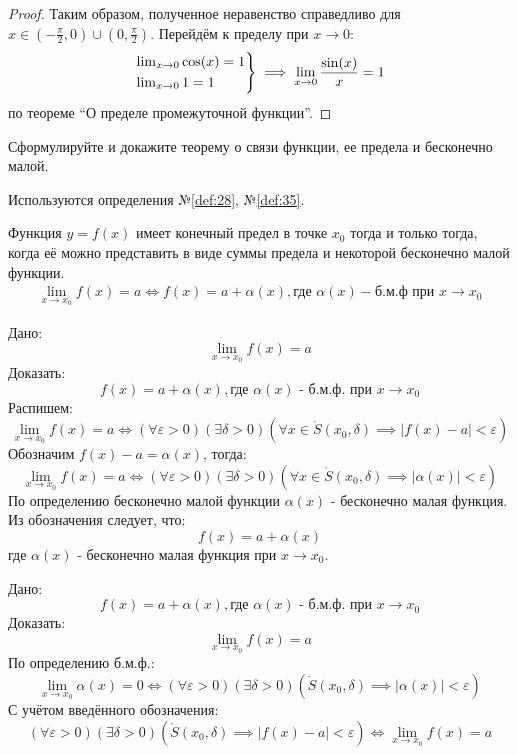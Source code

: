 \begin{proof}
    Таким образом, полученное неравенство справедливо для $x \in \left(-\frac{\pi}{2}, 0\right) \cup \left(0, \frac{\pi}{2}\right)$. Перейдём к пределу при $x \to 0$:
    \begin{gather*}
        \begin{rcases*}
            \lim_{x \to 0} \cos(x) = 1 \\
            \lim_{x \to 0} 1 = 1 
        \end{rcases*} 
        \implies \lim_{x \to 0} \frac{\sin(x)}{x} = 1
    \end{gather*}
    по теореме ``О пределе промежуточной функции''.
\end{proof}
\pagebreak



\begin{question}
    Сформулируйте и докажите теорему о связи функции, ее предела и бесконечно малой.
\end{question}
\begin{used}
    Используются определения №\ref{def:28}, №\ref{def:35}.
\end{used}
\begin{theorem}
    Функция $y = f(x)$ имеет конечный предел в точке  $x_0$ тогда и только тогда, когда её можно представить в виде суммы предела и некоторой бесконечно малой функции.
    \begin{gather*}
        \lim_{x \to x_0} f(x) = a \iff f(x) = a + \alpha(x), \text{где } \alpha(x) - \text{б.м.ф при } x \to x_0
    \end{gather*}
\end{theorem}
\begin{necessity}
    Дано: \[
        \lim_{x \to x_0} f(x) = a
    \]
    Доказать: \[
        f(x) = a + \alpha(x), \text{где } \alpha(x) \text{ - б.м.ф. при } x \to  x_0
    \]
    Распишем: \[
        \lim_{x \to x_0} f(x) = a \iff (\forall \varepsilon > 0)(\exists \delta > 0)(\forall x \in \mathring{S}(x_0, \delta) \implies |f(x) - a| < \varepsilon)  
    \]
    Обозначим $f(x) - a = \alpha(x)$, тогда: \[
        \lim_{x \to x_0} f(x) = a \iff (\forall \varepsilon > 0)(\exists \delta > 0)(\forall x \in \mathring{S}(x_0, \delta) \implies |\alpha(x)| < \varepsilon)  
    \]
    По определению бесконечно малой функции $\alpha(x)$ - бесконечно малая функция. Из обозначения следует, что: \[
        f(x) = a + \alpha(x)
    \]
    где $\alpha(x)$ - бесконечно малая функция при $x \to x_0$.
\end{necessity}
\begin{sufficiency}
    Дано: \[
        f(x) = a + \alpha(x), \text{где } \alpha(x) \text{ - б.м.ф. при } x \to x_0
    \]
    Доказать: \[
        \lim_{x \to x_0} f(x) = a
    \]
    По определению б.м.ф.: \[
        \lim_{x \to x_0} \alpha(x) = 0 \iff (\forall \varepsilon > 0)(\exists \delta > 0)(\mathring{S}(x_0, \delta) \implies |\alpha(x)| < \varepsilon)
    \]
    С учётом введённого обозначения: \[
        (\forall \varepsilon > 0)(\exists \delta > 0)(\mathring{S}(x_0, \delta) \implies |f(x) - a| < \varepsilon) \iff \lim_{x \to x_0} f(x) = a
    \]
\end{sufficiency}
\pagebreak


